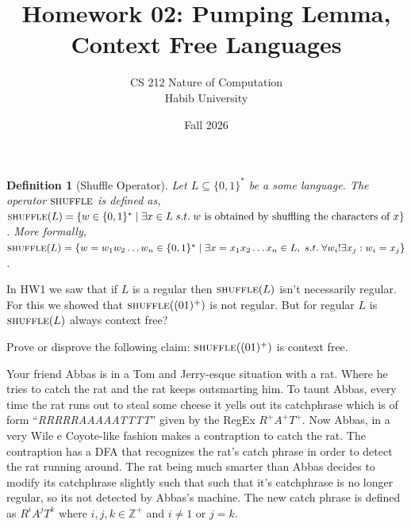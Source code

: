 \documentclass[a4paper]{exam}
\title{Homework 02: Pumping Lemma, Context Free Languages}
\author{CS 212 Nature of Computation\\Habib University\\
}
\date{Fall 2026}
\newcommand{\shuffle}{\textsc{shuffle}} %
\newtheorem{definition}{Definition}
\begin{document}
\maketitle


\begin{questions}

    \question[10] 
    \begin{definition}[Shuffle Operator]
        Let $L \subseteq \{0,1\}^*$ be a some language. The operator $\shuffle$ is defined as, $\shuffle(L) = \{w\in \{0,1\}^*\mid \exists x \in L \;s.t. \; w \text{ is obtained by shuffling the characters of } x\}$. More formally, $\shuffle(L) = \{w = w_1w_2\dots w_n\in \{0,1\}^*\mid \exists x = x_1x_2 \dots x_n \in L, \;s.t.\; \forall w_i !\exists x_j : w_i = x_j\}$. 
    \end{definition}

    In HW1 we saw that if $L$ is a regular then $\shuffle(L)$ isn't necessarily regular. For this we showed that $\shuffle((01)^+)$ is not regular. But for regular $L$ is $\shuffle(L)$ always context free?
    
    Prove or disprove the following claim: $\shuffle((01)^+)$ is context free. 

    \begin{solution}
    \end{solution}



  
    \question Your friend Abbas is in a Tom and Jerry-esque situation with a rat. Where he tries to catch the rat and the rat keeps outsmarting him. To taunt Abbas, every time the rat runs out to steal some cheese it yells out its catchphrase which is of form ``\emph{RRRRRAAAAATTTT}'' given by the RegEx $R^+A^+T^+$. Now Abbas, in a very Wile e Coyote-like fashion makes a contraption to catch the rat. The contraption has a DFA that recognizes the rat's catch phrase in order to detect the rat running around. The rat being much smarter than Abbas decides to modify its catchphrase slightly such that such that it's catchphrase is no longer regular, so its not detected by Abbas's machine. The new catch phrase is defined as $R^iA^jT^k$ where $i,j,k \in \mathbb{Z}^+$ and $i \neq 1$ or $j = k$.
\end{questions}
\end{document}
